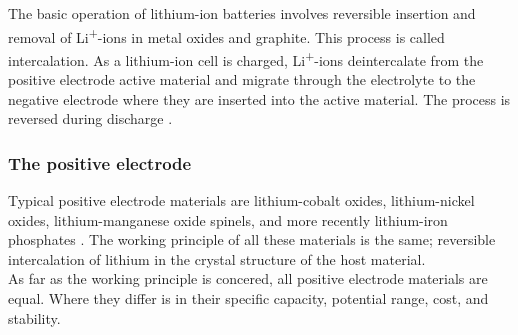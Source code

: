 \documentclass[12pt]{article} %
\begin{document}
The basic operation of lithium-ion batteries involves reversible insertion and removal of Li\textsuperscript{+}-ions in metal oxides and graphite.
This process is called intercalation.
As a lithium-ion cell is charged, Li\textsuperscript{+}-ions deintercalate from the positive electrode active material and migrate through the electrolyte to the negative electrode where they are inserted into the active material.
The process is reversed during discharge \cite{reddy_thomas_section_2011-1}.

\subsubsection{The positive electrode} %

Typical positive electrode materials are lithium-cobalt oxides, lithium-nickel oxides, lithium-manganese oxide spinels, and more recently lithium-iron phosphates \cite{kulova_new_2013}.
The working principle of all these materials is the same; reversible intercalation of lithium in the crystal structure of the host material.
\\
As far as the working principle is concered, all positive electrode materials are equal.
Where they differ is in their specific capacity, potential range, cost, and stability.
\end{document}
